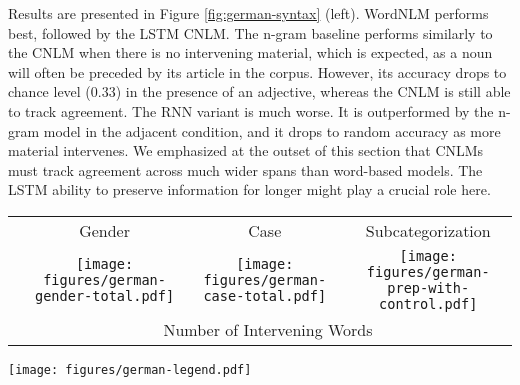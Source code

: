 Results are presented in Figure \ref{fig:german-syntax}
(left). WordNLM performs best, followed by the LSTM CNLM.  The n-gram
baseline performs similarly to the CNLM when there is no intervening
material, which is expected, as a noun will often be preceded by its
article in the corpus. However, its accuracy drops to chance level
(0.33) in the presence of an adjective, whereas the CNLM is still able
to track agreement. %
The RNN variant is much worse. It is outperformed by the n-gram model
in the adjacent condition, and it drops to random accuracy as more
material intervenes. We emphasized at the outset of this section that
CNLMs must track agreement across much wider spans than
word-based models. The LSTM ability to preserve information for
longer might play a crucial role here.



\begin{figure*}
	\begin{tabular}{cccc}
		& Gender & Case & Subcategorization \\ 
		\raisebox{1.7\height}{\rotatebox[origin=c]{90}{Accuracy}}
		&
\texttt{[image: figures/german-gender-total.pdf]} 
		&
		\texttt{[image: figures/german-case-total.pdf]}
		&
\texttt{[image: figures/german-prep-with-control.pdf]} \\ 
		&\multicolumn{3}{c}{Number of Intervening Words}
	\end{tabular}
\centering\texttt{[image: figures/german-legend.pdf]}
\caption{Accuracy in the German syntax tasks, in function of number of intervening words.}\label{fig:german-syntax}
\end{figure*}


